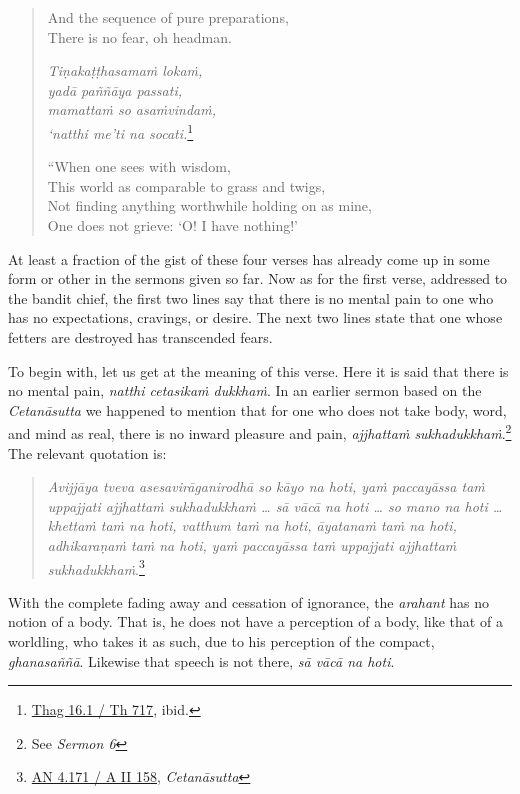 \begin{quote}
\clearpage

And the sequence of pure preparations,\\
There is no fear, oh headman.

\emph{Tiṇakaṭṭhasamaṁ lokaṁ,}\\
\emph{yadā paññāya passati,}\\
\emph{mamattaṁ so asaṁvindaṁ,}\\
\emph{`natthi me'ti na socati.}\footnote{\href{https://suttacentral.net/thag16.1/pli/ms}{Thag 16.1 / Th 717}, ibid.}

``When one sees with wisdom,\\
This world as comparable to grass and twigs,\\
Not finding anything worthwhile holding on as mine,\\
One does not grieve: `O! I have nothing!'
\end{quote}

At least a fraction of the gist of these four verses has already come up in some form or other in the sermons given so far. Now as for the first verse, addressed to the bandit chief, the first two lines say that there is no mental pain to one who has no expectations, cravings, or desire. The next two lines state that one whose fetters are destroyed has transcended fears.

To begin with, let us get at the meaning of this verse. Here it is said that there is no mental pain, \emph{natthi cetasikaṁ dukkhaṁ}. In an earlier sermon based on the \emph{Cetanāsutta} we happened to mention that for one who does not take body, word, and mind as real, there is no inward pleasure and pain, \emph{ajjhattaṁ sukhadukkhaṁ}.\footnote{See \emph{Sermon 6}} The relevant quotation is:

\begin{quote}
\emph{Avijjāya tveva asesavirāganirodhā so kāyo na hoti, yaṁ paccayāssa taṁ uppajjati ajjhattaṁ sukhadukkhaṁ \ldots{} sā vācā na hoti \ldots{} so mano na hoti \ldots{} khettaṁ taṁ na hoti, vatthum taṁ na hoti, āyatanaṁ taṁ na hoti, adhikaraṇaṁ taṁ na hoti, yaṁ paccayāssa taṁ uppajjati ajjhattaṁ sukhadukkhaṁ}.\footnote{\href{https://suttacentral.net/an4.171/pli/ms}{AN 4.171 / A II 158}, \emph{Cetanāsutta}}
\end{quote}

With the complete fading away and cessation of ignorance, the \emph{arahant} has no notion of a body. That is, he does not have a perception of a body, like that of a worldling, who takes it as such, due to his perception of the compact, \emph{ghanasaññā}. Likewise that speech is not there, \emph{sā vācā na hoti}.

